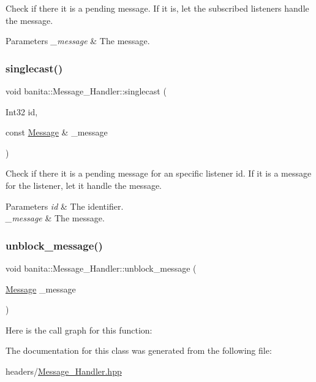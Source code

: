Check if there it is a pending message. If it is, let the subscribed listeners handle the message. 


\begin{DoxyParams}{Parameters}
{\em \+\_\+message} & The message. \\
\hline
\end{DoxyParams}
\mbox{\label{classbanita_1_1_message___handler_a689c5f2971747e4b7c9e3b5a678adf52}} 
\subsubsection{\texorpdfstring{singlecast()}{singlecast()}}
{\footnotesize\ttfamily void banita\+::\+Message\+\_\+\+Handler\+::singlecast (\begin{DoxyParamCaption}\item[{Int32}]{id,  }\item[{const \mbox{\hyperlink{classbanita_1_1_message}{Message}} \&}]{\+\_\+message }\end{DoxyParamCaption})}



Check if there it is a pending message for an specific listener id. If it is a message for the listener, let it handle the message. 


\begin{DoxyParams}{Parameters}
{\em id} & The identifier. \\
\hline
{\em \+\_\+message} & The message. \\
\hline
\end{DoxyParams}
\mbox{\label{classbanita_1_1_message___handler_ae1f927231f5e2b9807c281dc83decb1d}} 
\subsubsection{\texorpdfstring{unblock\_message()}{unblock\_message()}}
{\footnotesize\ttfamily void banita\+::\+Message\+\_\+\+Handler\+::unblock\+\_\+message (\begin{DoxyParamCaption}\item[{\mbox{\hyperlink{classbanita_1_1_message}{Message}}}]{\+\_\+message }\end{DoxyParamCaption})\hspace{0.3cm}{\ttfamily [inline]}}

Here is the call graph for this function\+:


The documentation for this class was generated from the following file\+:\begin{DoxyCompactItemize}
\item 
headers/\mbox{\hyperlink{_message___handler_8hpp}{Message\+\_\+\+Handler.\+hpp}}\end{DoxyCompactItemize}

